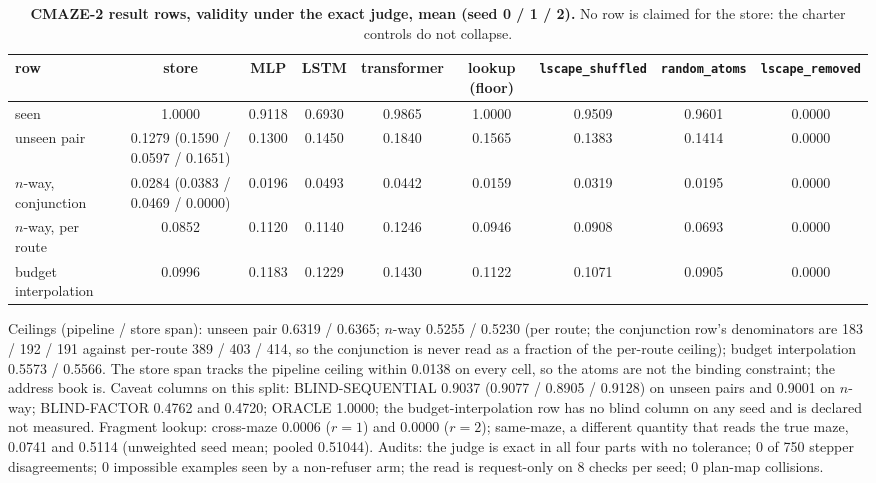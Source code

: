\documentclass{article} %
\begin{document}
\begin{table}[h]
\centering\scriptsize
\caption{\textbf{CMAZE-2 result rows, validity under the exact judge, mean (seed 0 / 1 / 2).} No
row is claimed for the store: the charter controls do not collapse.}
\label{tab:cmaze2}
\setlength{\tabcolsep}{1.8pt}
\begin{tabular}{lcccccccc}
\toprule
row & store & MLP & LSTM & transformer & lookup (floor) & \texttt{lscape\_shuffled} & \texttt{random\_atoms} & \texttt{lscape\_removed} \\
\midrule
seen & 1.0000 & 0.9118 & 0.6930 & 0.9865 & 1.0000 & 0.9509 & 0.9601 & 0.0000 \\
unseen pair & 0.1279 (0.1590 / 0.0597 / 0.1651) & 0.1300 & 0.1450 & 0.1840 & 0.1565 & 0.1383 & 0.1414 & 0.0000 \\
$n$-way, conjunction & 0.0284 (0.0383 / 0.0469 / 0.0000) & 0.0196 & 0.0493 & 0.0442 & 0.0159 & 0.0319 & 0.0195 & 0.0000 \\
$n$-way, per route & 0.0852 & 0.1120 & 0.1140 & 0.1246 & 0.0946 & 0.0908 & 0.0693 & 0.0000 \\
budget interpolation & 0.0996 & 0.1183 & 0.1229 & 0.1430 & 0.1122 & 0.1071 & 0.0905 & 0.0000 \\
\bottomrule
\end{tabular}
\end{table}

\noindent Ceilings (pipeline / store span): unseen pair 0.6319 / 0.6365; $n$-way 0.5255 / 0.5230
(per route; the conjunction row's denominators are 183 / 192 / 191 against per-route 389 / 403 /
414, so the conjunction is never read as a fraction of the per-route ceiling); budget interpolation
0.5573 / 0.5566. The store span tracks the pipeline ceiling within 0.0138 on every cell, so the
atoms are not the binding constraint; the address book is. Caveat columns on this split:
BLIND-SEQUENTIAL 0.9037 (0.9077 / 0.8905 / 0.9128) on unseen pairs and 0.9001 on $n$-way;
BLIND-FACTOR 0.4762 and 0.4720; ORACLE 1.0000; the budget-interpolation row has no blind column on
any seed and is declared not measured. Fragment lookup: cross-maze 0.0006 ($r=1$) and 0.0000
($r=2$); same-maze, a different quantity that reads the true maze, 0.0741 and 0.5114 (unweighted
seed mean; pooled 0.51044). %
Audits: the judge is exact in all four parts with no tolerance; 0 of 750 stepper disagreements; 0
impossible examples seen by a non-refuser arm; the read is request-only on 8 checks per seed; 0
plan-map collisions. %
\end{document}
